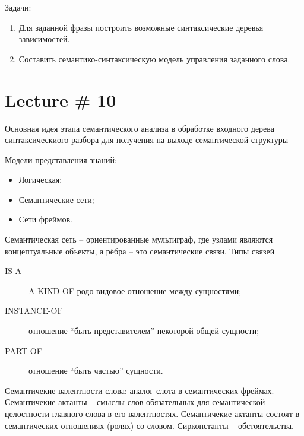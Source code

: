 \documentclass[a4paper]{article}
\newcommand{\eng}[1]{\foreignlanguage{english}{#1}}
\begin{document}
Задачи:
\begin{enumerate}
	\item Для заданной фразы построить возможные синтаксические деревья зависимостей.
	\item Составить семантико-синтаксическую модель управления заданного слова.
\end{enumerate}


\section{Lecture \# 10} %
\label{sec:lecture_10}
Основная идея этапа семантического анализа в обработке входного дерева синтаксическиого разбора для получения на выходе семантической структуры

Модели представления знаний: \begin{itemize}
	\item Логическая;
	\item Семантические сети;
	\item Сети фреймов.
\end{itemize}

Семантическая сеть -- ориентированные мультиграф, где узлами являются концептуальные
объекты, а рёбра -- это семантические связи. Типы связей \begin{description}
	\item[\eng{IS-A}] \eng{A-KIND-OF} родо-видовое отношение между сущностями;
	\item[\eng{INSTANCE-OF}] отношение ``быть представителем'' некоторой общей сущности;
	\item[\eng{PART-OF}] отношение ``быть частью'' сущности.
\end{description}

Семантичекие валентности слова: аналог слота в семантических фреймах. Семантичекие
актанты -- смыслы слов обязательных для семантической целостности главного слова в
его валентностях. Семантичекие актанты состоят в семантических отношениях (ролях)
со словом. Сирконстанты -- обстоятельства.



\end{document}
